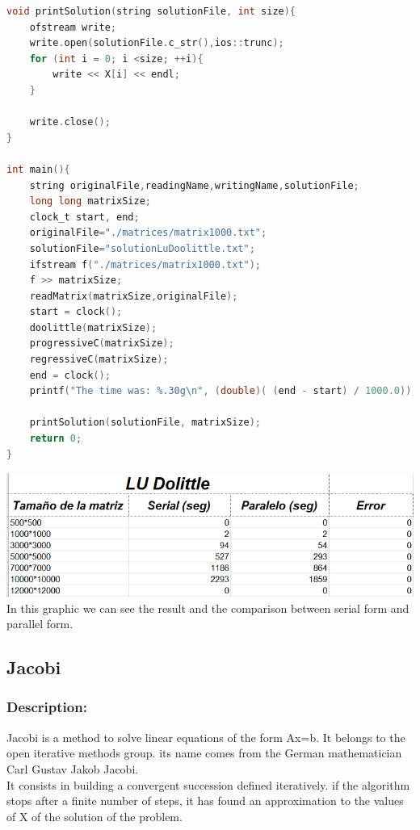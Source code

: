 \documentclass{article}
\newcounter{subsubsubsection}[subsubsection]
\begin{document}
\begin{lstlisting}[language=C]
void printSolution(string solutionFile, int size){
    ofstream write;
    write.open(solutionFile.c_str(),ios::trunc);
    for (int i = 0; i <size; ++i){
        write << X[i] << endl;
    }

    write.close();
}

int main(){
	string originalFile,readingName,writingName,solutionFile;
    long long matrixSize;
    clock_t start, end;
    originalFile="./matrices/matrix1000.txt";
    solutionFile="solutionLuDoolittle.txt";
    ifstream f("./matrices/matrix1000.txt");
    f >> matrixSize; 
    readMatrix(matrixSize,originalFile);
    start = clock();
    doolittle(matrixSize);
    progressiveC(matrixSize);
    regressiveC(matrixSize);
    end = clock(); 
    printf("The time was: %.30g\n", (double)( (end - start) / 1000.0)); 
   
    printSolution(solutionFile, matrixSize);
	return 0;
}
\end{lstlisting}





\includegraphics[width=\linewidth]{./images/dolittle.png}\\
In this graphic we can see the result and the comparison between serial form and parallel form.

\newpage

\subsection{Jacobi}

\subsubsection{Description:}
Jacobi is a method to solve linear equations of the form Ax=b. It belongs to the open iterative methods group. its name comes from the German mathematician Carl Gustav Jakob Jacobi.\\

It consists in building a convergent succession defined iteratively. if the algorithm stops after a finite number of steps, it has found an approximation to the values of X of the solution of the problem.\\
\end{document}
